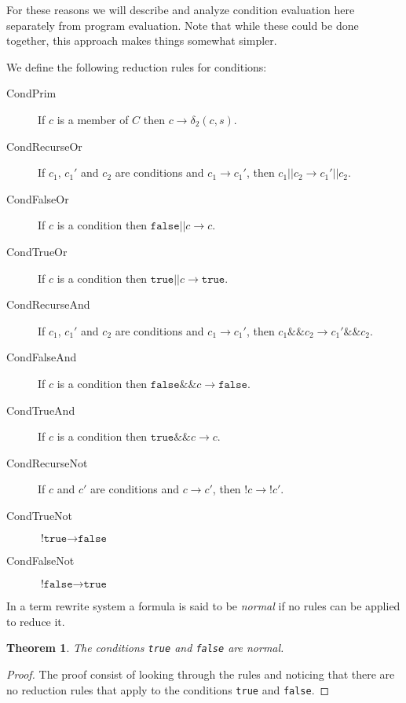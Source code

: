 \documentclass[11pt]{article}
\begin{document}
For these reasons we will describe and analyze condition evaluation here separately from program evaluation.  Note that while these could be done together, this approach makes things somewhat simpler.

We define the following reduction rules for conditions:

\begin{description}

\item[CondPrim] If $c$ is a member of $C$ then $c \rightarrow \delta_{2}(c, s)$.

\item[CondRecurseOr] If $c_{1}$, $c_{1}'$ and $c_{2}$ are conditions and $c_{1} \rightarrow c_{1}'$, then
$c_{1}\texttt{||}c_{2} \rightarrow c_{1}'\texttt{||}c_{2}$.
\item[CondFalseOr] If $c$ is a condition then $\texttt{false||} c \rightarrow c$.
\item[CondTrueOr] If $c$ is a condition then $\texttt{true||} c \rightarrow \texttt{true}$.

\item[CondRecurseAnd] If $c_{1}$, $c_{1}'$ and $c_{2}$ are conditions and $c_{1} \rightarrow c_{1}'$, then
$c_{1}\texttt{\&\&}c_{2} \rightarrow c_{1}'\texttt{\&\&}c_{2}$.
\item[CondFalseAnd] If $c$ is a condition then $\texttt{false\&\&} c \rightarrow \texttt{false}$.
\item[CondTrueAnd] If $c$ is a condition then $\texttt{true\&\&} c \rightarrow c$.

\item[CondRecurseNot] If $c$ and $c'$ are conditions and $c \rightarrow c'$, then
$\texttt{!}c \rightarrow \texttt{!}c'$.
\item[CondTrueNot] $\texttt{!true} \rightarrow \texttt{false}$
\item[CondFalseNot] $\texttt{!false} \rightarrow \texttt{true}$

\end{description}

In a term rewrite system a formula is said to be \emph{normal} if no rules can be applied to reduce it.

\newtheorem{truefalsearenormal}{Theorem}
\begin{truefalsearenormal}
The conditions \texttt{true} and \texttt{false} are normal.
\end{truefalsearenormal}

\begin{proof}
The proof consist of looking through the rules and noticing that there are no reduction rules that apply to the conditions \texttt{true} and \texttt{false}.
\end{proof}
\end{document}
